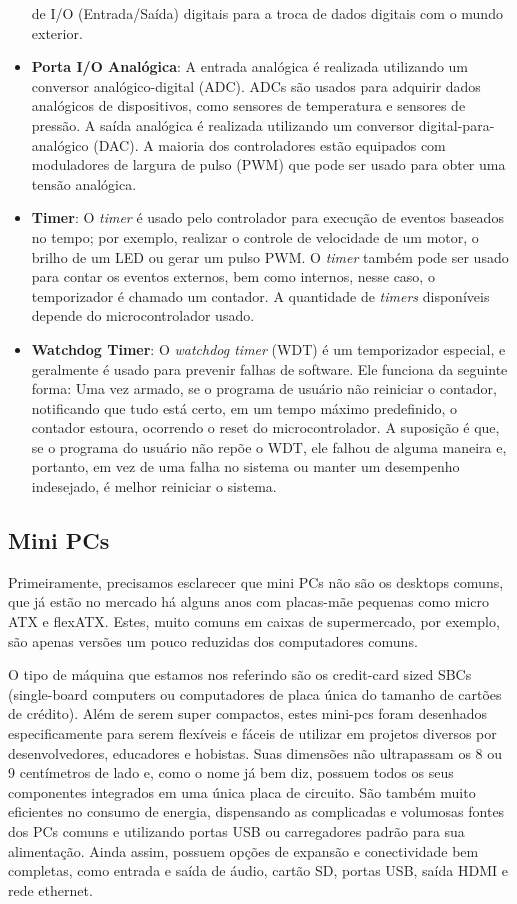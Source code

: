 \begin{itemize}
de I/O (Entrada/Saída) digitais para a troca de dados digitais com
o mundo exterior. 
\item \textbf{Porta I/O Analógica}: A entrada analógica é realizada utilizando
um conversor analógico-digital (ADC). ADCs são usados para adquirir
dados analógicos de dispositivos, como sensores de temperatura e sensores
de pressão. A saída analógica é realizada utilizando um conversor
digital-para-analógico (DAC). A maioria dos controladores estão equipados
com moduladores de largura de pulso (PWM) que pode ser usado para
obter uma tensão analógica.
\item \textbf{Timer}: O \emph{timer} é usado pelo controlador para execução
de eventos baseados no tempo; por exemplo, realizar o controle de
velocidade de um motor, o brilho de um LED ou gerar um pulso PWM.
O \emph{timer} também pode ser usado para contar os eventos externos,
bem como internos, nesse caso, o temporizador é chamado um contador.
A quantidade de \emph{timers} disponíveis depende do microcontrolador
usado.
\item \textbf{Watchdog Timer}: O \emph{watchdog timer} (WDT) é um temporizador
especial, e geralmente é usado para prevenir falhas de software. Ele
funciona da seguinte forma: Uma vez armado, se o programa de usuário
não reiniciar o contador, notificando que tudo está certo, em um tempo
máximo predefinido, o contador estoura, ocorrendo o reset do microcontrolador.
A suposição é que, se o programa do usuário não repõe o WDT, ele falhou
de alguma maneira e, portanto, em vez de uma falha no sistema ou manter
um desempenho indesejado, é melhor reiniciar o sistema.
\end{itemize}

\subsection{Mini PCs}

Primeiramente, precisamos esclarecer que mini PCs não são os desktops
comuns, que já estão no mercado há alguns anos com placas-mãe pequenas
como micro ATX e flexATX. Estes, muito comuns em caixas de supermercado,
por exemplo, são apenas versões um pouco reduzidas dos computadores
comuns.

O tipo de máquina que estamos nos referindo são os credit-card sized
SBCs (single-board computers ou computadores de placa única do tamanho
de cartões de crédito). Além de serem super compactos, estes mini-pcs
foram desenhados especificamente para serem flexíveis e fáceis de
utilizar em projetos diversos por desenvolvedores, educadores e hobistas.
Suas dimensões não ultrapassam os 8 ou 9 centímetros de lado e, como
o nome já bem diz, possuem todos os seus componentes integrados em
uma única placa de circuito. São também muito eficientes no consumo
de energia, dispensando as complicadas e volumosas fontes dos PCs
comuns e utilizando portas USB ou carregadores padrão para sua alimentação.
Ainda assim, possuem opções de expansão e conectividade bem completas,
como entrada e saída de áudio, cartão SD, portas USB, saída HDMI e
rede ethernet.

